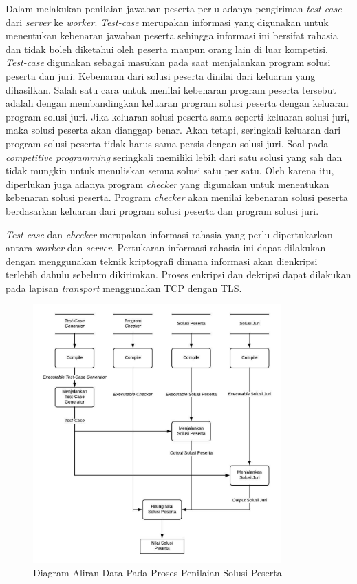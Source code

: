 \par Dalam melakukan penilaian jawaban peserta perlu adanya pengiriman \textit{test-case} dari \textit{server} ke \textit{worker}. \textit{Test-case} merupakan informasi yang digunakan untuk menentukan kebenaran jawaban peserta sehingga informasi ini bersifat rahasia dan tidak boleh diketahui oleh peserta maupun orang lain di luar kompetisi. \textit{Test-case} digunakan sebagai masukan pada saat menjalankan program solusi peserta dan juri. Kebenaran dari solusi peserta dinilai dari keluaran yang dihasilkan. Salah satu cara untuk menilai kebenaran program peserta tersebut adalah dengan membandingkan keluaran program solusi peserta dengan keluaran program solusi juri. Jika keluaran solusi peserta sama seperti keluaran solusi juri, maka solusi peserta akan dianggap benar. Akan tetapi, seringkali keluaran dari program solusi peserta tidak harus sama persis dengan solusi juri. Soal pada \textit{competitive programming} seringkali memiliki lebih dari satu solusi yang sah dan tidak mungkin untuk menuliskan semua solusi satu per satu. Oleh karena itu, diperlukan juga adanya program \textit{checker} yang digunakan untuk menentukan kebenaran solusi peserta. Program \textit{checker} akan menilai kebenaran solusi peserta berdasarkan keluaran dari program solusi peserta dan program solusi juri.

\par \textit{Test-case} dan \textit{checker} merupakan informasi rahasia yang perlu dipertukarkan antara \textit{worker} dan \textit{server}. Pertukaran informasi rahasia ini dapat dilakukan dengan menggunakan teknik kriptografi dimana informasi akan dienkripsi terlebih dahulu sebelum dikirimkan. Proses enkripsi dan dekripsi dapat dilakukan pada lapisan \textit{transport} menggunakan TCP dengan TLS.

\begin{figure}[ht!]
    \centering
    \includegraphics[width=0.85\textwidth]{images/grading-dfd}
    \caption{Diagram Aliran Data Pada Proses Penilaian Solusi Peserta}
    \label{fig:grading-dfd}
\end{figure}


